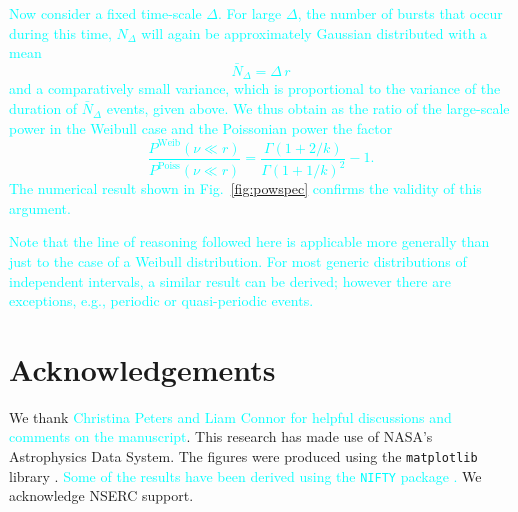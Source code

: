 \documentclass[fleqn,usenatbib]{mnras}
\newcommand{\new}[1]{\textcolor{cyan}{#1}}
\begin{document}
\new{Now consider a fixed time-scale $\Delta$. For large $\Delta$, the number of bursts that occur during this time, $N_\Delta$ will again be approximately Gaussian distributed with a mean
\begin{equation}
	\bar{N}_\Delta = \Delta \, r
\end{equation}
and a comparatively small variance, which is proportional to the variance of the duration of $\bar{N}_\Delta$ events, given above. We thus obtain as the ratio of the large-scale power in the Weibull case and the Poissonian power the factor
\begin{equation}
	\frac{P^{\mathrm{Weib}}(\nu \ll r)}{P^{\mathrm{Poiss}}(\nu \ll r)} = \frac{\Gamma\left(1 + 2/k\right)}{\Gamma\left(1 + 1/k\right)^2} - 1.
\end{equation}
The numerical result shown in Fig.~\ref{fig:powspec} confirms the validity of this argument.}

\new{Note that the line of reasoning followed here is applicable more generally than just to the case of a Weibull distribution. For most generic distributions of independent intervals, a similar result can be derived; however there are exceptions, e.g., periodic or quasi-periodic events.}


\section*{Acknowledgements}

We thank \new{Christina Peters and Liam Connor for helpful discussions and comments on the manuscript}. This research has made use of NASA's Astrophysics Data System. The figures were produced using the \texttt{matplotlib} library \citep{hunter-2007}. \new{Some of the results have been derived using the \texttt{NIFTY} package \citep{selig-2013}.} We acknowledge NSERC support.







\bsp
\label{lastpage}
\end{document}
